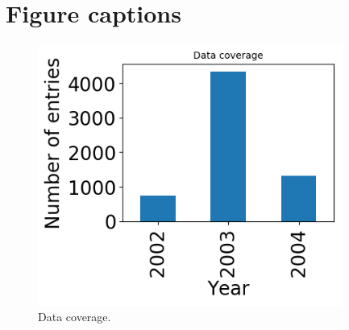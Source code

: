 \documentclass[utf8]{frontiersSCNS} %
\begin{document}
\section*{Figure captions}



\begin{figure}[h!]
	\begin{center}
		\includegraphics[width=10cm]{Roberts/datacoverage}%
	\end{center}
	\caption{ Data coverage.}\label{fig:datacoverage}
\end{figure}
\end{document}
